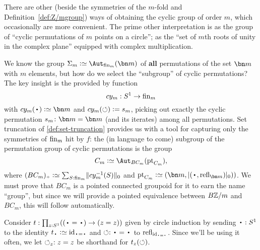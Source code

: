 \begin{example}
\label{ex:Cm}
There are other (beside the symmetries of the $m$-fold \covering and Definition~\ref{def:Z/mgroup}) ways of obtaining the cyclic group of order $m$, which occasionally are more convenient.  The prime other interpretation is as the group of ``cyclic permutations of $m$ points on a circle''; \ie as the ``set of $m$th roots of unity in the complex plane'' equipped with complex multiplication.

We know the group $\Sigma_m\defequi\aut_{\fin_m}(\bn m)$ of {\bf all} permutations of the set $\bn m$ with $m$ elements, but how do we select the ``subgroup'' of cyclic permutations?
The key insight is the provided by function
$$cy_m:S^1\to\fin_m$$
with $cy_m(\base)\defequi\bn m$ and
$cy_m(\circlearrowleft)\mathrel{\vcentcolon=} s_m$, picking out exactly the cyclic permutation $s_m\colon\bn m=\bn m$ (and its iterates) among all permutations.  Set truncation of \cref{def:set-truncation} provides us with a tool for capturing only the symmetries of $\fin_m$ hit by $f$: the (in language to come) subgroup of the permutation group of cyclic permutations is the group
$$C_m\defequi\aut_{BC_m}(\pt_{C_m}),$$
where $(BC_m)_\div\defequi \sum_{S:\fin_m}\Trunc{cy_m^{-1}(S)}_0$ and $\pt_{C_m}\defequi (\bn m,\trunc{(\base,\refl{\bn m})}_0))$.  We must prove that $BC_m$ is a pointed connected groupoid for it to earn the name ``group'', but since we will provide a pointed equivalence between $B\mathbb{Z}/m$ and $BC_m$, this will follow automatically.


Consider $t:\prod_{z:S^1}((\base=\base)\to(z=z))$ given by circle induction by sending $\base:S^1$ to the identity $t_\base\defequi\id_{\base=\base}$ and $\Sloop:\base=\base$ to $\refl{\id_{\base=\base}}$.
Since we'll be using it often, we let $\circlearrowleft_z:z=z$ be shorthand for $t_z(\circlearrowleft)$.


\end{example}
